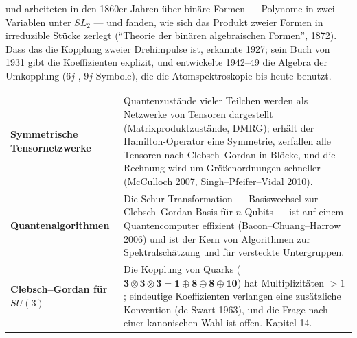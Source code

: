 \begin{geschichte}
 und  arbeiteten in den 1860er Jahren über binäre Formen --- Polynome in zwei Variablen unter $SL_2$ --- und fanden, wie sich das Produkt zweier Formen in irreduzible Stücke zerlegt (\enquote{Theorie der binären algebraischen Formen}, 1872). Dass das die Kopplung zweier Drehimpulse ist, erkannte  1927; sein Buch von 1931 gibt die Koeffizienten explizit, und  entwickelte 1942--49 die Algebra der Umkopplung ($6j$-, $9j$-Symbole), die die Atomspektroskopie bis heute benutzt.

\begin{center}
\begin{minipage}{0.9\textwidth}
\end{minipage}
\end{center}
\end{geschichte}

\begin{forschung}
\begin{center}
{\small
\renewcommand{\arraystretch}{1.45}
\begin{tabular}{@{}P{3.0cm}P{5.2cm}@{}}
\toprule
\textbf{Symmetrische Tensornetzwerke} & Quantenzustände vieler Teilchen werden als Netzwerke von Tensoren dargestellt (Matrixproduktzustände, DMRG); erhält der Hamilton-Operator eine Symmetrie, zerfallen alle Tensoren nach Clebsch--Gordan in Blöcke, und die Rechnung wird um Größenordnungen schneller (McCulloch 2007, Singh--Pfeifer--Vidal 2010).\\
\textbf{Quanten\-algorithmen} & Die Schur-Transformation --- Basiswechsel zur Clebsch--Gordan-Basis für $n$ Qubits --- ist auf einem Quantencomputer effizient (Bacon--Chuang--Harrow 2006) und ist der Kern von Algorithmen zur Spektralschätzung und für versteckte Untergruppen.\\
\textbf{Clebsch--Gordan für $SU(3)$} & Die Kopplung von Quarks ($\mathbf 3\otimes\mathbf 3\otimes\mathbf 3 = \mathbf 1\oplus\mathbf 8\oplus\mathbf 8\oplus\mathbf{10}$) hat Multiplizitäten $> 1$; eindeutige Koeffizienten verlangen eine zusätzliche Konvention (de Swart 1963), und die Frage nach einer kanonischen Wahl ist offen. Kapitel 14.\\
\bottomrule
\end{tabular}}
\end{center}
\end{forschung}


